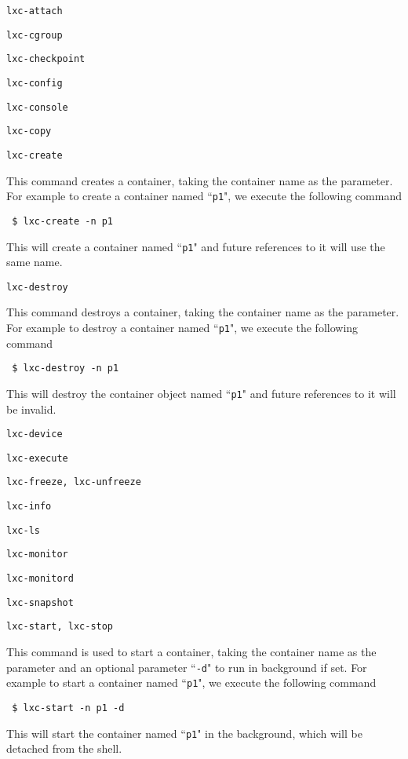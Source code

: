 \documentclass[12pt]{article}
\begin{document}
{\parindent0pt %

\texttt{lxc-attach}

\texttt{lxc-cgroup}

\texttt{lxc-checkpoint}

\texttt{lxc-config}

\texttt{lxc-console}

\texttt{lxc-copy}

\texttt{lxc-create}
\begin{dent}
This command creates a container, taking the container name as the parameter. For example to create a container named ``\texttt{p1}", we execute the following command

\texttt{ \$ lxc-create -n p1}

This will create a container named ``\texttt{p1}" and future references to it will use the same name.
\end{dent}

\texttt{lxc-destroy}
\begin{dent}
This command destroys a container, taking the container name as the parameter. For example to destroy a container named ``\texttt{p1}", we execute the following command

\texttt{ \$ lxc-destroy -n p1}

This will destroy the container object named ``\texttt{p1}" and future references to it will be invalid.
\end{dent}

\texttt{lxc-device}

\texttt{lxc-execute}

\texttt{lxc-freeze, lxc-unfreeze}

\texttt{lxc-info}

\texttt{lxc-ls}

\texttt{lxc-monitor}

\texttt{lxc-monitord}

\texttt{lxc-snapshot}

\texttt{lxc-start, lxc-stop}
\begin{dent}
This command is used to start a container, taking the container name as the parameter and an optional parameter ``\texttt{-d}" to run in background if set. For example to start a container named ``\texttt{p1}", we execute the following command

\texttt{ \$ lxc-start -n p1 -d}

This will start the container named ``\texttt{p1}" in the background, which will be detached from the shell.
\end{dent}

}
\end{document}

